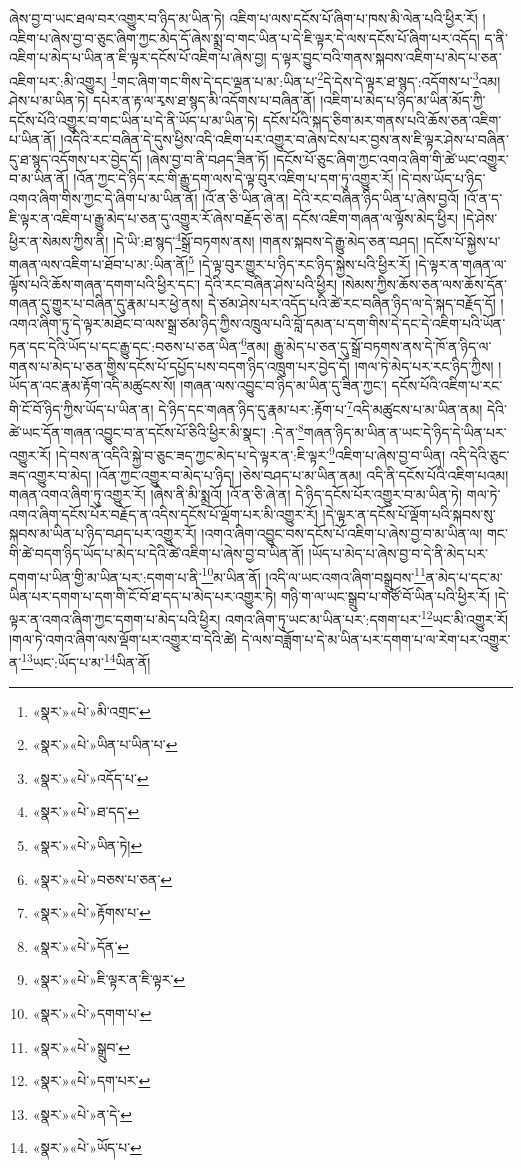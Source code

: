 ཞེས་བྱ་བ་ཡང་ཐལ་བར་འགྱུར་བ་ཉིད་མ་ཡིན་ཏེ། འཇིག་པ་ལས་དངོས་པོ་ཞིག་པ་ཁས་མི་ལེན་པའི་ཕྱིར་རོ། །འཇིག་པ་ཞེས་བྱ་བ་ཅུང་ཞིག་ཀྱང་མེད་དོ་ཞེས་སྨྲ་བ་གང་ཡིན་པ་དེ་ཇི་ལྟར་དེ་ལས་དངོས་པོ་ཞིག་པར་འདོད། ད་ནི་འཇིག་པ་མེད་པ་ཡིན་ན་ཇི་ལྟར་དངོས་པོ་འཇིག་པ་ཞེས་བྱ། ད་ལྟར་བྱུང་བའི་གནས་སྐབས་འཇིག་པ་མེད་པ་ཅན་འཇིག་པར་:མི་འགྱུར། \footnote{«སྣར་»«པེ་»མི་འགྲང་}གང་ཞིག་གང་གིས་དེ་དང་ལྡན་པ་མ་:ཡིན་པ་\footnote{«སྣར་»«པེ་»ཡིན་པ་ཡིན་པ་}དེ་དེས་དེ་ལྟར་ཐ་སྙད་:འདོགས་པ་\footnote{«སྣར་»«པེ་»འདོད་པ་}འམ། ཤེས་པ་མ་ཡིན་ཏེ། དཔེར་ན་རྟ་ལ་རྭས་ཐ་སྙད་མི་འདོགས་པ་བཞིན་ནོ། །འཇིག་པ་མེད་པ་ཉིད་མ་ཡིན་མོད་ཀྱི་དངོས་པོའི་འགྱུར་བ་གང་ཡིན་པ་དེ་ནི་ཡོད་པ་མ་ཡིན་ཏེ། དངོས་པོའི་སྐད་ཅིག་མར་གནས་པའི་ཆོས་ཅན་འཇིག་པ་ཡིན་ནོ། །འདིའི་རང་བཞིན་དེ་དུས་ཕྱིས་འདི་འཇིག་པར་འགྱུར་བ་ཞེས་ངེས་པར་བྱས་ནས་ཇི་ལྟར་ཤེས་པ་བཞིན་དུ་ཐ་སྙད་འདོགས་པར་བྱེད་དོ། །ཞེས་བྱ་བ་ནི་བཤད་ཟིན་ཏོ། །དངོས་པོ་ཅུང་ཞིག་ཀྱང་འགའ་ཞིག་གི་ཚེ་ཡང་འགྱུར་བ་མ་ཡིན་ནོ། །འོན་ཀྱང་དེ་ཉིད་རང་གི་རྒྱུ་དག་ལས་དེ་ལྟ་བུར་འཇིག་པ་དག་ཏུ་འགྱུར་རོ། །དེ་བས་ཡོད་པ་ཉིད་འགའ་ཞིག་གིས་ཀྱང་དེ་ཞིག་པ་མ་ཡིན་ནོ། །འོ་ན་ཅི་ཡིན་ཞེ་ན། དེའི་རང་བཞིན་ཉིད་ཡིན་པ་ཞེས་བྱའོ། །འོ་ན་ད་ཇི་ལྟར་ན་འཇིག་པ་རྒྱུ་མེད་པ་ཅན་དུ་འགྱུར་རོ་ཞེས་བརྗོད་ཅེ་ན། དངོས་འཇིག་གཞན་ལ་ལྟོས་མེད་ཕྱིར། །དེ་ཤེས་ཕྱིར་ན་སེམས་ཀྱིས་ནི། །དེ་ཡི་:ཐ་སྙད་\footnote{«སྣར་»«པེ་»ཐ་དད་}སྒྲོ་བཏགས་ནས། །གནས་སྐབས་དེ་རྒྱུ་མེད་ཅན་བཤད། །དངོས་པོ་སྐྱེས་པ་གཞན་ལས་འཇིག་པ་ཐོབ་པ་མ་:ཡིན་ནོ།\footnote{«སྣར་»«པེ་»ཡིན་ཏེ།} །དེ་ལྟ་བུར་གྱུར་པ་ཉིད་རང་ཉིད་སྐྱེས་པའི་ཕྱིར་རོ། །དེ་ལྟར་ན་གཞན་ལ་ལྟོས་པའི་ཆོས་གཞན་དགག་པའི་ཕྱིར་དང་། དེའི་རང་བཞིན་ཤེས་པའི་ཕྱིར། །སེམས་ཀྱིས་ཆོས་ཅན་ལས་ཆོས་དོན་གཞན་དུ་གྱུར་པ་བཞིན་དུ་རྣམ་པར་ཕྱེ་ནས། དེ་ཙམ་ཤེས་པར་འདོད་པའི་ཚེ་རང་བཞིན་ཉིད་ལ་དེ་སྐད་བརྗོད་དོ། །འགའ་ཞིག་ཏུ་དེ་ལྟར་མཐོང་བ་ལས་སྒྲ་ཙམ་ཉིད་ཀྱིས་འཁྲུལ་པའི་བློ་དམན་པ་དག་གིས་དེ་དང་དེ་འཇིག་པའི་ཡོན་ཏན་དང་དེའི་ཡོད་པ་དང་རྒྱུ་དང་:བཅས་པ་ཅན་ཡིན་\footnote{«སྣར་»«པེ་»བཅས་པ་ཅན་}ནམ། རྒྱུ་མེད་པ་ཅན་དུ་སྒྲོ་བཏགས་ནས་དེ་ཁོ་ན་ཉིད་ལ་གནས་པ་མེད་པ་ཅན་གྱིས་དངོས་པོ་དཔྱོད་པས་བདག་ཉིད་འཁྲུག་པར་བྱེད་དོ། །གལ་ཏེ་མེད་པར་རང་ཉིད་ཀྱིས། །ཡོད་ན་འང་རྣམ་རྟོག་འདི་མཚུངས་སོ། །གཞན་ལས་འབྱུང་བ་ཉིད་མ་ཡིན་དུ་ཟིན་ཀྱང་། དངོས་པོའི་འཇིག་པ་རང་གི་ངོ་བོ་ཉིད་ཀྱིས་ཡོད་པ་ཡིན་ན། དེ་ཉིད་དང་གཞན་ཉིད་དུ་རྣམ་པར་:རྟོག་པ་\footnote{«སྣར་»«པེ་»རྟོགས་པ་}འདི་མཚུངས་པ་མ་ཡིན་ནམ། དེའི་ཚེ་ཡང་དོན་གཞན་འབྱུང་བ་ན་དངོས་པོ་ཅིའི་ཕྱིར་མི་སྣང་། :དེ་ན་\footnote{«སྣར་»«པེ་»དོན་}གཞན་ཉིད་མ་ཡིན་ན་ཡང་དེ་ཉིད་དེ་ཡིན་པར་འགྱུར་རོ། །དེ་བས་ན་འདིའི་སྐྱེ་བ་ཅུང་ཟད་ཀྱང་མེད་པ་དེ་ལྟར་ན་:ཇི་ལྟར་\footnote{«སྣར་»«པེ་»ཇི་ལྟར་ན་ཇི་ལྟར་}འཇིག་པ་ཞེས་བྱ་བ་ཡིན། འདི་དེའི་ཅུང་ཟད་འགྱུར་བ་མེད། །འོན་ཀྱང་འགྱུར་བ་མེད་པ་ཉིད། །ཅེས་བཤད་པ་མ་ཡིན་ནམ། འདི་ནི་དངོས་པོའི་འཇིག་པའམ། གཞན་འགའ་ཞིག་ཏུ་འགྱུར་རོ། །ཞེས་ནི་མི་སྨྲའོ། །འོ་ན་ཅི་ཞེ་ན། དེ་ཉིད་དངོས་པོར་འགྱུར་བ་མ་ཡིན་ཏེ། གལ་ཏེ་འགའ་ཞིག་དངོས་པོར་བརྗོད་ན་འདིས་དངོས་པོ་ལྡོག་པར་མི་འགྱུར་རོ། །དེ་ལྟར་ན་དངོས་པོ་ལྡོག་པའི་སྐབས་སུ་སྐབས་མ་ཡིན་པ་ཉིད་བཤད་པར་འགྱུར་རོ། །འགའ་ཞིག་འབྱུང་བས་དངོས་པོ་འཇིག་པ་ཞེས་བྱ་བ་མ་ཡིན་ལ། གང་གི་ཚེ་བདག་ཉིད་ཡོད་པ་མེད་པ་དེའི་ཚེ་འཇིག་པ་ཞེས་བྱ་བ་ཡིན་ནོ། །ཡོད་པ་མེད་པ་ཞེས་བྱ་བ་དེ་ནི་མེད་པར་དགག་པ་ཡིན་གྱི་མ་ཡིན་པར་:དགག་པ་ནི་\footnote{«སྣར་»«པེ་»དགག་པ་}མ་ཡིན་ནོ། །འདི་ལ་ཡང་འགའ་ཞིག་བསྒྲུབས་\footnote{«སྣར་»«པེ་»སྒྲུབ་}ན་མེད་པ་དང་མ་ཡིན་པར་དགག་པ་དག་གི་ངོ་བོ་ཐ་དད་པ་མེད་པར་འགྱུར་ཏེ། གཉི་ག་ལ་ཡང་སྒྲུབ་པ་གཙོ་བོ་ཡིན་པའི་ཕྱིར་རོ། །དེ་ལྟར་ན་འགའ་ཞིག་ཀྱང་དགག་པ་མེད་པའི་ཕྱིར། འགའ་ཞིག་ཏུ་ཡང་མ་ཡིན་པར་:དགག་པར་\footnote{«སྣར་»«པེ་»དག་པར་}ཡང་མི་འགྱུར་རོ། །གལ་ཏེ་འགའ་ཞིག་ལས་ལྡོག་པར་འགྱུར་བ་དེའི་ཚེ། དེ་ལས་བཟློག་པ་དེ་མ་ཡིན་པར་དགག་པ་ལ་རེག་པར་འགྱུར་ན་\footnote{«སྣར་»«པེ་»ན་དེ་}ཡང་:ཡོད་པ་མ་\footnote{«སྣར་»«པེ་»ཡོད་པ་}ཡིན་ནོ། 